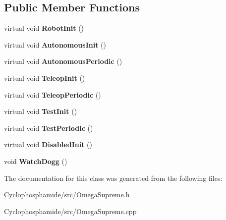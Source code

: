 \subsection*{Public Member Functions}
\begin{DoxyCompactItemize}
\item 
\hypertarget{class_omega_supreme_a482ca0a74da81753c74370a7e87d1648}{}virtual void {\bfseries Robot\+Init} ()\label{class_omega_supreme_a482ca0a74da81753c74370a7e87d1648}

\item 
\hypertarget{class_omega_supreme_a90b13863e87bcb023e3d17da3da64de3}{}virtual void {\bfseries Autonomous\+Init} ()\label{class_omega_supreme_a90b13863e87bcb023e3d17da3da64de3}

\item 
\hypertarget{class_omega_supreme_af61caca5d9dc88aaaaff05a129e2c5cc}{}virtual void {\bfseries Autonomous\+Periodic} ()\label{class_omega_supreme_af61caca5d9dc88aaaaff05a129e2c5cc}

\item 
\hypertarget{class_omega_supreme_a63020edb1ab98ac912df92b99bb02618}{}virtual void {\bfseries Teleop\+Init} ()\label{class_omega_supreme_a63020edb1ab98ac912df92b99bb02618}

\item 
\hypertarget{class_omega_supreme_a70ba01219fd7d9cea9c11856146ca1d3}{}virtual void {\bfseries Teleop\+Periodic} ()\label{class_omega_supreme_a70ba01219fd7d9cea9c11856146ca1d3}

\item 
\hypertarget{class_omega_supreme_ab1974ba070c3b095e2e49b1372e8f3bc}{}virtual void {\bfseries Test\+Init} ()\label{class_omega_supreme_ab1974ba070c3b095e2e49b1372e8f3bc}

\item 
\hypertarget{class_omega_supreme_ab410619ec5070b06a26ba9ad42458e4b}{}virtual void {\bfseries Test\+Periodic} ()\label{class_omega_supreme_ab410619ec5070b06a26ba9ad42458e4b}

\item 
\hypertarget{class_omega_supreme_a13f930ffdaac6e4a9d16cd94623b8e32}{}virtual void {\bfseries Disabled\+Init} ()\label{class_omega_supreme_a13f930ffdaac6e4a9d16cd94623b8e32}

\item 
\hypertarget{class_omega_supreme_ac9c5876cc5178fa49e1654689264b08e}{}void {\bfseries Watch\+Dogg} ()\label{class_omega_supreme_ac9c5876cc5178fa49e1654689264b08e}

\end{DoxyCompactItemize}


The documentation for this class was generated from the following files\+:\begin{DoxyCompactItemize}
\item 
Cyclophosphamide/src/Omega\+Supreme.\+h\item 
Cyclophosphamide/src/Omega\+Supreme.\+cpp\end{DoxyCompactItemize}
